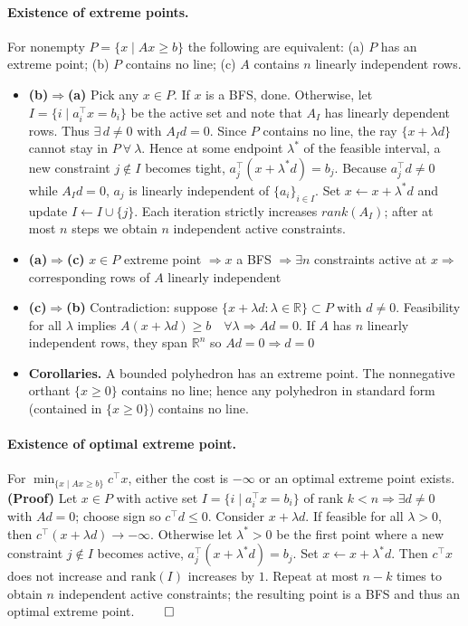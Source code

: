 \documentclass{article}
\begin{document}
\paragraph{Existence of extreme points.}
For nonempty $P=\{x\mid Ax\ge b\}$ the following are equivalent:
(a) $P$ has an extreme point;
(b) $P$ contains no line;
(c) $A$ contains $n$ linearly independent rows.

\begin{itemize}
\item \textbf{(b)$\Rightarrow$(a)} 
Pick any $x\in P$. If $x$ is a BFS, done.  
Otherwise, let $I=\{i\mid a_i^\top x=b_i\}$ be the active set and note that $A_I$ has linearly dependent rows. Thus $\exists\, d\neq 0$ with $A_I d = 0$. 
Since $P$ contains no line, the ray $\{x+\lambda d\}$ cannot stay in $P\ \forall\ \lambda$.  
Hence at some endpoint $\lambda^*$ of the feasible interval, a new constraint $j\notin I$ becomes tight, $a_j^\top(x+\lambda^* d)=b_j$. 
Because $a_j^\top d\neq 0$ while $A_I d=0$, $a_j$ is linearly independent of $\{a_i\}_{i\in I}$.  
Set $x\leftarrow x+\lambda^* d$ and update $I\leftarrow I\cup\{j\}$.  
Each iteration strictly increases $rank(A_I)$; after at most $n$ steps we obtain $n$ independent active constraints. 

\item \textbf{(a)$\Rightarrow$(c)} 
$x\in P$ extreme point $\Rightarrow x$ a BFS $\Rightarrow \exists n$ constraints active at $x \Rightarrow$ corresponding rows of $A$ linearly independent

\item \textbf{(c)$\Rightarrow$(b)} 
Contradiction: suppose $\{x+\lambda d : \lambda\in\mathbb R\} \subset P$ with $d\neq 0$.  
Feasibility for all $\lambda$ implies $A(x+\lambda d)\ge b \quad\forall\lambda \Longrightarrow Ad = 0$. 
If $A$ has $n$ linearly independent rows, they span $\mathbb R^n$ so $Ad=0 \Rightarrow d=0$

\item \textbf{Corollaries.}
A bounded polyhedron has an extreme point.  
The nonnegative orthant $\{x\ge 0\}$ contains no line; hence any polyhedron in standard form (contained in $\{x\ge 0\}$) contains no line.
\end{itemize}




\paragraph{Existence of optimal extreme point.}
For $\min_{\{x\mid Ax\ge b\}}c^\top x$, either the cost is $-\infty$ or an optimal extreme point exists.
\textbf{(Proof)}
Let $x\in P$ with active set $I=\{i\mid a_i^\top x=b_i\}$ of rank $k<n \Longrightarrow \exists d\neq 0$ with $Ad=0$; choose sign so $c^\top d\le 0$.
Consider $x+\lambda d$. If feasible for all $\lambda>0$, then $c^\top(x+\lambda d)\to -\infty$.  
Otherwise let $\lambda^*>0$ be the first point where a new constraint $j\notin I$ becomes active, $a_j^\top(x+\lambda^* d)=b_j$.
Set $x\leftarrow x+\lambda^* d$.  
Then $c^\top x$ does not increase and $\text{rank}(I)$ increases by $1$.
Repeat at most $n-k$ times to obtain $n$ independent active constraints; the resulting point is a BFS and thus an optimal extreme point. $\qed$
\end{document}
